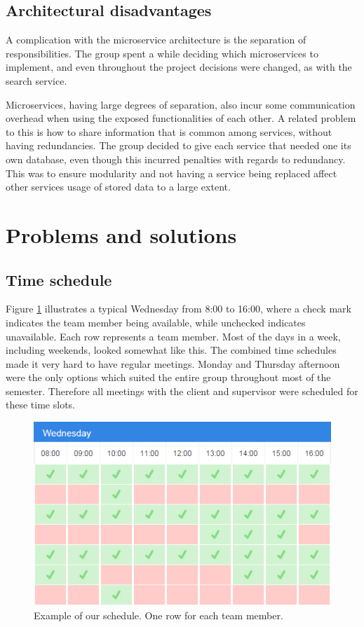 \subsection{Architectural disadvantages}
A complication with the microservice architecture is the separation of responsibilities. The group spent a while deciding which microservices to implement, and even throughout the project decisions were changed, as with the search service. 

Microservices, having large degrees of separation, also incur some communication overhead when using the exposed functionalities of each other. A related problem to this is how to share information that is common among services, without having redundancies. The group decided to give each service that needed one its own database, even though this incurred penalties with regards to redundancy. This was to ensure modularity and not having a service being replaced affect other services usage of stored data to a large extent. 

\section{Problems and solutions} 

\subsection {Time schedule}
\label{sub:timeSchedule}
Figure \ref{fig:wednesday} illustrates a typical Wednesday from 8:00 to 16:00, where a check mark indicates the team member being available, while unchecked indicates unavailable. Each row represents a team member. Most of the days in a week, including weekends, looked somewhat like this. The combined time schedules made it very hard to have regular meetings. Monday and Thursday afternoon were the only options which suited the entire group throughout most of the semester. Therefore all meetings with the client and supervisor were scheduled for these time slots. 

\begin{figure}[H]
    \centering
    \includegraphics[scale=0.70]{fig/summary/wednesday}
    \caption{Example of our schedule. One row for each team member.}
    \label{fig:wednesday}
\end{figure}


